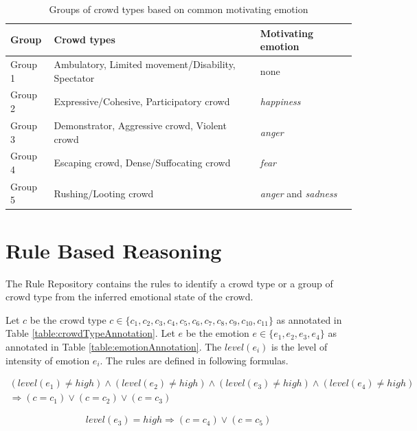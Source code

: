 \begin{table}
\centering
\caption{Groups of crowd types based on common motivating emotion}
\label{table:crowdTypeGroup}
\begin{tabular}{|p{1.5cm}|p{9cm}|p{3.5cm}|}

\hline
\textbf{Group} & \textbf{Crowd types} & \textbf{Motivating emotion} \\ \hline \hline
Group 1 & Ambulatory, Limited movement/Disability, Spectator & none \\ \hline
Group 2 & Expressive/Cohesive, Participatory crowd & \textit{happiness} \\ \hline
Group 3 & Demonstrator, Aggressive crowd, Violent crowd & \textit{anger} \\ \hline
Group 4 & Escaping crowd, Dense/Suffocating crowd & \textit{fear} \\ \hline
Group 5 & Rushing/Looting crowd & \textit{anger} and \textit{sadness} \\ \hline
\end{tabular}
\end{table}

\section{Rule Based Reasoning}

The Rule Repository contains the rules to identify a crowd type or a group of crowd type from the inferred emotional state of the crowd. 

Let \(c\) be the crowd type \(c \in \{c_1, c_2, c_3, c_4, c_5, c_6, c_7, c_8, c_9, c_{10}, c_{11}\}\) as annotated in Table \ref{table:crowdTypeAnnotation}. Let \(e\) be the emotion \(e \in \{e_1, e_2, e_3, e_4\}\) as annotated in Table \ref{table:emotionAnnotation}. The \(level(e_i)\) is the level of intensity of emotion \(e_i\). The rules are defined in following formulas.

\begin{equation}
\label{eq:rule1}
\begin{split}
	(level(e_1) \neq high) \land (level(e_2) \neq high) \land (level(e_3) \neq high) \land (level(e_4) \neq high) \\
	\Rightarrow (c = c_1) \lor (c = c_2) \lor (c = c_3)
\end{split}
\end{equation}

\begin{equation}
\label{eq:rule2}
	level(e_3) = high \Rightarrow (c = c_4) \lor (c = c_5)
\end{equation}

